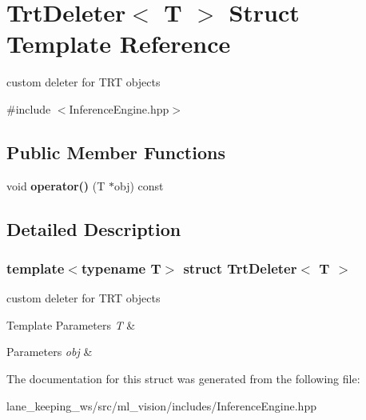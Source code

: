 \hypertarget{structTrtDeleter}{}\section{Trt\+Deleter$<$ T $>$ Struct Template Reference}
\label{structTrtDeleter}


custom deleter for T\+RT objects  




{\ttfamily \#include $<$Inference\+Engine.\+hpp$>$}

\subsection*{Public Member Functions}
\begin{DoxyCompactItemize}
\item 
\mbox{\label{structTrtDeleter_a5a8f61aa50660de1de56ac8d31461bcd}} 
void {\bfseries operator()} (T $\ast$obj) const
\end{DoxyCompactItemize}


\subsection{Detailed Description}
\subsubsection*{template$<$typename T$>$\newline
struct Trt\+Deleter$<$ T $>$}

custom deleter for T\+RT objects 


\begin{DoxyTemplParams}{Template Parameters}
{\em T} & \\
\hline
\end{DoxyTemplParams}

\begin{DoxyParams}{Parameters}
{\em obj} & \\
\hline
\end{DoxyParams}


The documentation for this struct was generated from the following file\+:\begin{DoxyCompactItemize}
\item 
lane\+\_\+keeping\+\_\+ws/src/ml\+\_\+vision/includes/Inference\+Engine.\+hpp\end{DoxyCompactItemize}
